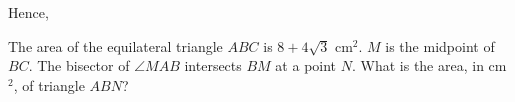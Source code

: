 \documentclass[12pt,paper=letter]{scrartcl}
\begin{document}
Hence, 

\newpage

\begin{probboxed}
The area of the equilateral triangle $ABC$ is $8 + 4\sqrt{3}$ cm$^2$. $M$ is the midpoint of $BC$. The bisector of $\angle MAB$ intersects $BM$ at a point $N.$ What is the area, in cm$^2$, of triangle $ABN$?

\begin{center}
    



\begin{tikzpicture}[x=0.75pt,y=0.75pt,yscale=-1,xscale=1]


\end{tikzpicture}
\end{center}
\end{probboxed}
\end{document}
